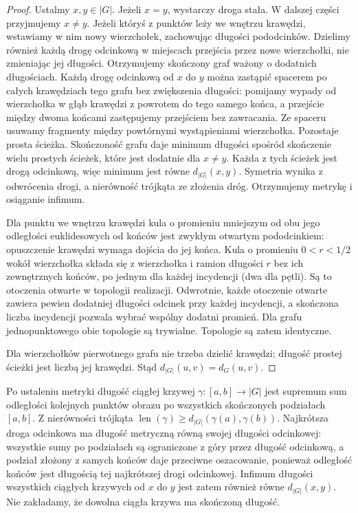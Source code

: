 \begin{proof}
Ustalmy $x,y\in|G|$. Jeżeli $x=y$, wystarczy droga stała.
W dalszej części przyjmujemy $x\ne y$. Jeżeli któryś
z punktów leży we wnętrzu krawędzi, wstawiamy w nim
nowy wierzchołek, zachowując długości pododcinków.
Dzielimy również każdą drogę odcinkową w miejscach
przejścia przez nowe wierzchołki, nie zmieniając jej długości.
Otrzymujemy skończony graf ważony o dodatnich długościach.
Każdą drogę odcinkową od $x$ do $y$ można zastąpić spacerem
po całych krawędziach tego grafu bez zwiększenia długości:
pomijamy wypady od wierzchołka w głąb krawędzi z powrotem
do tego samego końca, a przejście między dwoma końcami
zastępujemy przejściem bez zawracania. Ze spaceru usuwamy
fragmenty między powtórnymi wystąpieniami wierzchołka.
Pozostaje prosta ścieżka. Skończoność grafu daje minimum
długości spośród skończenie wielu prostych ścieżek,
które jest dodatnie dla $x\ne y$. Każda z tych ścieżek
jest drogą odcinkową, więc minimum jest równe $d_{|G|}(x,y)$.
Symetria wynika z odwrócenia drogi, a nierówność
trójkąta ze złożenia dróg. Otrzymujemy metrykę i osiąganie
infimum.

Dla punktu we wnętrzu krawędzi kula o promieniu mniejszym
od obu jego odległości euklidesowych od końców jest
zwykłym otwartym pododcinkiem: opuszczenie krawędzi
wymaga dojścia do jej końca. Kula o promieniu
$0<r<1/2$ wokół wierzchołka składa się z wierzchołka
i ramion długości $r$ bez ich zewnętrznych końców,
po jednym dla każdej incydencji (dwa dla pętli).
Są to otoczenia otwarte w topologii realizacji.
Odwrotnie, każde otoczenie otwarte zawiera pewien
dodatniej długości odcinek przy każdej incydencji,
a skończona liczba incydencji pozwala wybrać wspólny
dodatni promień. Dla grafu jednopunktowego obie
topologie są trywialne. Topologie są zatem identyczne.

Dla wierzchołków pierwotnego grafu nie trzeba dzielić
krawędzi; długość prostej ścieżki jest liczbą jej krawędzi.
Stąd $d_{|G|}(u,v)=d_G(u,v)$.
\end{proof}

\begin{uwaga}
Po ustaleniu metryki długość ciągłej krzywej
$\gamma:[a,b]\to|G|$ jest supremum sum odległości
kolejnych punktów obrazu po wszystkich skończonych
podziałach $[a,b]$. Z nierówności trójkąta
$\operatorname{len}(\gamma)\geq d_{|G|}(\gamma(a),\gamma(b))$.
Najkrótsza droga odcinkowa ma długość metryczną równą
swojej długości odcinkowej: wszystkie sumy po podziałach
są ograniczone z góry przez długość odcinkową, a podział
złożony z samych końców daje przeciwne oszacowanie,
ponieważ odległość końców jest długością tej najkrótszej
drogi odcinkowej.
Infimum długości wszystkich ciągłych krzywych od $x$ do $y$
jest zatem również równe $d_{|G|}(x,y)$.
Nie zakładamy, że dowolna ciągła krzywa ma skończoną długość.
\end{uwaga}
